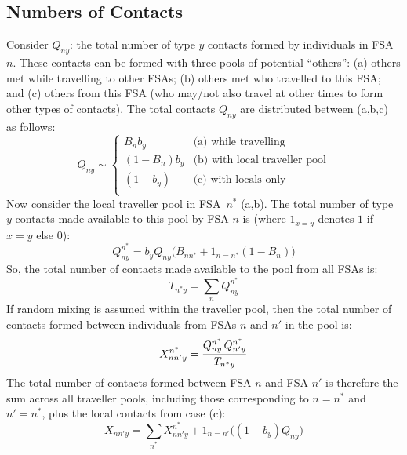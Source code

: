 \documentclass{article}
\begin{document}
  \subsection{Numbers of Contacts}\label{ss:math}
  Consider $Q_{ny}$: the total number of type $y$ contacts formed by individuals in FSA $n$.
  These contacts can be formed with three pools of potential ``others'':
  (a) others met while travelling to other FSAs;
  (b) others met who travelled to this FSA; and
  (c) others from this FSA (who may/not also travel at other times to form other types of contacts).
  The total contacts $Q_{ny}$ are distributed between (a,b,c) as follows:
  \begin{equation} 
    Q_{ny} \sim \begin{cases}
      B_n b_y     & \textrm{(a) while travelling} \\
      (1-B_n) b_y & \textrm{(b) with local traveller pool} \\
      (1-b_y)     & \textrm{(c) with locals only} \\
    \end{cases}
  \end{equation}
  Now consider the local traveller pool in FSA~$n^*$ (a,b).
  The total number of type $y$ contacts made available to this pool by FSA $n$ is
  (where $1_{x=y}$ denotes $1$ if $x=y$ else $0$):
  \begin{equation}
    Q^{n^*}_{ny} = b_y Q_{ny} \big( B_{nn^*} + 1_{n=n^*} (1-B_n) \big)
  \end{equation}
  So, the total number of contacts made available to the pool from all FSAs is:
  \begin{equation}
    T_{n^*y} = \sum_{n} Q^{n^*}_{ny}
  \end{equation}
  If random mixing is assumed within the traveller pool,
  then the total number of contacts formed between
  individuals from FSAs $n$ and $n'$ in the pool is:
  \begin{equation}
    X^{n^*}_{nn'y} = \frac{Q^{n^*}_{ny} \thinspace Q^{n^*}_{n'y}}{T_{n^*y}}
  \end{equation}
  The total number of contacts formed between FSA $n$ and FSA $n'$ is therefore
  the sum across all traveller pools, including those corresponding to $n=n^*$ and $n'=n^*$,
  plus the local contacts from case (c):
  \begin{equation}
  X_{nn'y} = \sum_{n^*} X^{n^*}_{nn'y} + 1_{n=n'}\big( (1-b_y) Q_{ny} \big)
  \end{equation}
\end{document}
